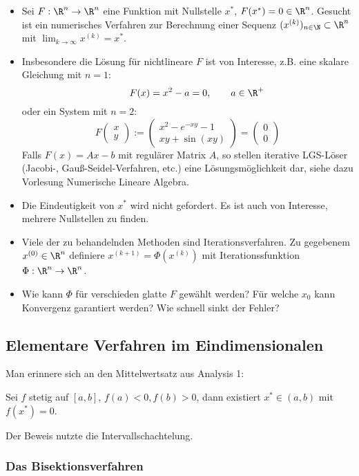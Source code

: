 \documentclass[11pt]{scrartcl}
\begin{document}
\begin{itemize}
	\item
		Sei $F:\R^n \to \R^n$ eine Funktion mit Nullstelle $x^*$, $F(x^*) = 0 \in \R^n$.
		Gesucht ist ein numerisches Verfahren zur Berechnung einer Sequenz $(x^{(k)})_{n\in \N} \subset \R^n$ mit $\lim_{k\to \infty} x^{(k)} = x^*$.
	\item
		Insbesondere die Lösung für nichtlineare $F$ ist von Interesse, z.B. eine skalare Gleichung mit $n=1$:
		\[
			\qquad F(x) = x^2 - a = 0, \qquad a\in \R^+
		\]
		oder ein System mit $n=2$:
		\[
			F \begin{pmatrix}
				x \\ y
			\end{pmatrix}
			:= \begin{pmatrix}
				x^2 - e^{-xy} - 1 \\
				xy + \sin(xy)
			\end{pmatrix}
			= \begin{pmatrix}
				0 \\ 0
			\end{pmatrix}
		\]
		Falls $F(x) = Ax - b$ mit regulärer Matrix $A$, so stellen iterative LGS-Löser (Jacobi-, Gauß-Seidel-Verfahren, etc.) eine Lösungsmöglichkeit dar, siehe dazu Vorlesung Numerische Lineare Algebra.
	\item
		Die Eindeutigkeit von $x^*$ wird nicht gefordert. 
		Es ist auch von Interesse, mehrere Nullstellen zu finden.
	\item
		Viele der zu behandelnden Methoden sind Iterationsverfahren.
		Zu gegebenem $x^{(0)} \in \R^n$ definiere $x^{(k+1)} = \Phi(x^{(k)})$ mit Iterationssfunktion $\Phi : \R^n \to \R^n$.
	\item
		Wie kann $\Phi$ für verschieden glatte $F$ gewählt werden?
		Für welche $x_0$ kann Konvergenz garantiert werden?
		Wie schnell sinkt der Fehler?
\end{itemize}


\subsection{Elementare Verfahren im Eindimensionalen}


Man erinnere sich an den Mittelwertsatz aus Analysis 1:

Sei $f$ stetig auf $[a,b]$, $f(a) < 0, f(b) > 0$, dann existiert $x^* \in (a,b)$ mit $f(x^*)=0$.

Der Beweis nutzte die Intervallschachtelung.

\subsubsection{Das Bisektionsverfahren}
\end{document}
